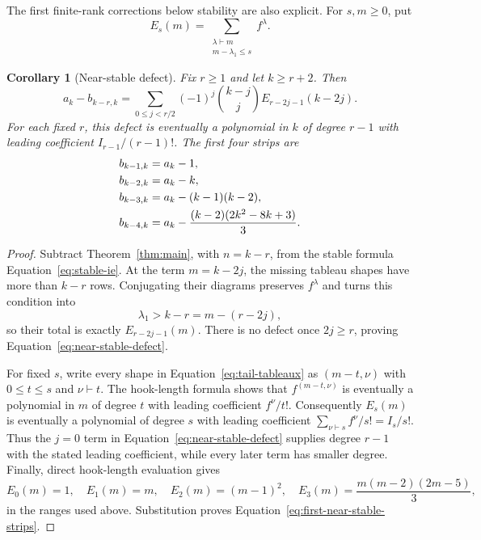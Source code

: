 \documentclass[11pt]{article}
\newtheorem{corollary}[theorem]{Corollary}
\theoremstyle{definition}
\begin{document}
The first finite-rank corrections below stability are also explicit.  For
$s,m\ge0$, put
\begin{equation}\label{eq:tail-tableaux}
 E_s(m)=\sum_{\substack{\lambda\vdash m\\m-\lambda_1\le s}}f^\lambda.
\end{equation}

\begin{corollary}[Near-stable defect]\label{cor:near-stable}
Fix $r\ge1$ and let $k\ge r+2$.  Then
\begin{equation}\label{eq:near-stable-defect}
 a_k-b_{k-r,k}
 =\sum_{0\le j<r/2}(-1)^j\binom{k-j}{j}
 E_{r-2j-1}(k-2j).
\end{equation}
For each fixed $r$, this defect is eventually a polynomial in $k$ of degree
$r-1$ with leading coefficient $I_{r-1}/(r-1)!$.  The first four strips are
\begin{align}\label{eq:first-near-stable-strips}
 b_{k-1,k}&=a_k-1,\notag\\
 b_{k-2,k}&=a_k-k,\notag\\
 b_{k-3,k}&=a_k-(k-1)(k-2),\\
 b_{k-4,k}&=a_k-\frac{(k-2)(2k^2-8k+3)}3.\notag
\end{align}
\end{corollary}

\begin{proof}
Subtract Theorem~\ref{thm:main}, with $n=k-r$, from the stable formula
Equation~\eqref{eq:stable-ie}.  At the term $m=k-2j$, the missing tableau
shapes have more than $k-r$ rows.  Conjugating their diagrams preserves
$f^\lambda$ and turns this condition into
\[
 \lambda_1>k-r=m-(r-2j),
\]
so their total is exactly $E_{r-2j-1}(m)$.  There is no defect once
$2j\ge r$, proving Equation~\eqref{eq:near-stable-defect}.

For fixed $s$, write every shape in Equation~\eqref{eq:tail-tableaux} as
$(m-t,\nu)$ with $0\le t\le s$ and $\nu\vdash t$.  The hook-length formula
shows that $f^{(m-t,\nu)}$ is eventually a polynomial in $m$ of degree $t$
with leading coefficient $f^\nu/t!$.  Consequently $E_s(m)$ is eventually
a polynomial of degree $s$ with leading coefficient
$\sum_{\nu\vdash s}f^\nu/s!=I_s/s!$.  Thus the $j=0$ term in
Equation~\eqref{eq:near-stable-defect} supplies degree $r-1$ with the stated
leading coefficient, while every later term has smaller degree.  Finally,
direct hook-length evaluation gives
\[
 E_0(m)=1,\quad E_1(m)=m,\quad E_2(m)=(m-1)^2,\quad
 E_3(m)=\frac{m(m-2)(2m-5)}3,
\]
in the ranges used above.  Substitution proves
Equation~\eqref{eq:first-near-stable-strips}.
\end{proof}
\end{document}
